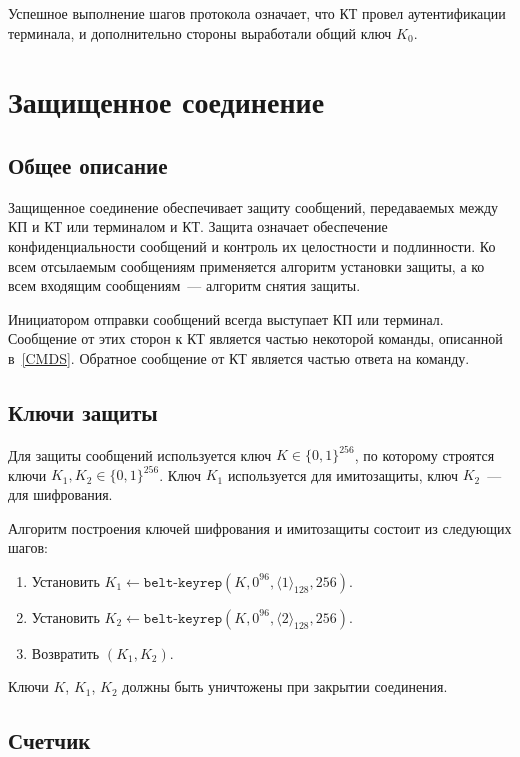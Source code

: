 Успешное выполнение шагов протокола означает, что КТ провел аутентификации 
терминала,  и дополнительно 
стороны выработали общий ключ $K_0$.

\section{Защищенное соединение}\label{CRYPTO.SM}

\subsection{Общее описание}

Защищенное соединение обеспечивает защиту сообщений, передаваемых между КП 
и КТ или терминалом и КТ. Защита означает обеспечение конфиденциальности сообщений 
и контроль их целостности и подлинности. Ко всем отсылаемым сообщениям 
применяется алгоритм установки защиты, а ко всем входящим сообщениям~--- 
алгоритм снятия защиты.

Инициатором отправки сообщений всегда выступает КП или терминал.
Сообщение от этих сторон к КТ является частью некоторой команды, 
описанной в~\ref{CMDS}. Обратное сообщение от КТ является частью ответа на 
команду.

\subsection{Ключи защиты}

Для защиты сообщений используется ключ $K\in\{0,1\}^{256}$, по которому строятся 
ключи $K_1, K_2 \in\{0,1\}^{256}$. Ключ $K_1$ используется для имитозащиты, 
ключ $K_2$~--- для шифрования.

Алгоритм построения ключей шифрования и имитозащиты состоит из следующих шагов:

\begin{enumerate}
\item
Установить 
$K_1\gets\texttt{belt-keyrep}(K, 0^{96}, \langle 1 \rangle_{128}, 256)$.

\item
Установить 
$K_2\gets\texttt{belt-keyrep}(K, 0^{96}, \langle 2 \rangle_{128}, 256)$.

\item
Возвратить $(K_1, K_2)$.
\end{enumerate}

Ключи $K$, $K_1$, $K_2$ должны быть уничтожены при закрытии соединения.

\subsection{Счетчик}\label{CRYPTO.SM.Ctr}

